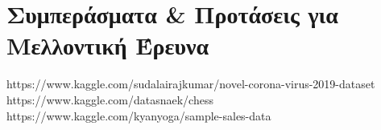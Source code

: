 \chapter{Συμπεράσματα \& Προτάσεις για Μελλοντική Έρευνα} \label{conclusions}
https://www.kaggle.com/sudalairajkumar/novel-corona-virus-2019-dataset
https://www.kaggle.com/datasnaek/chess
https://www.kaggle.com/kyanyoga/sample-sales-data